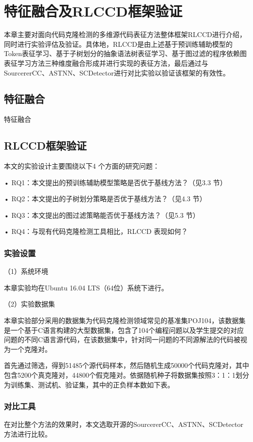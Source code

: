\chapter{特征融合及RLCCD框架验证}
本章主要对面向代码克隆检测的多维源代码表征方法整体框架RLCCD进行介绍，同时进行实验评估及验证。具体地，RLCCD是由上述基于预训练辅助模型的Token表征学习、基于子树划分的抽象语法树表征学习、基于图过滤的程序依赖图表征学习方法三种维度融合形成并进行实现的表征方法，最后通过与SourcererCC、ASTNN、SCDetector进行对比实验以验证该框架的有效性。
\section{特征融合}
特征融合
\section{RLCCD框架验证}
本文的实验设计主要围绕以下4 个方面的研究问题：

• RQ1：本文提出的预训练辅助模型策略是否优于基线方法？（见3.3 节）

• RQ2：本文提出的子树划分策略是否优于基线方法？（见4.3 节）

• RQ3：本文提出的图过滤策略能否优于基线方法？（见5.3 节）

• RQ4：与现有代码克隆检测工具相比，RLCCD 表现如何？

\subsection{实验设置}
（1）系统环境

本章实验均在Ubuntu 16.04 LTS（64位）系统下进行。


（2）实验数据集

本章实验部分采用的数据集为代码克隆检测领域常见的基准集POJ104，该数据集是一个基于C语言构建的大型数据集，包含了104个编程问题以及学生提交的对应问题的不同C语言源代码，在该数据集中，针对同一问题的不同源解法的代码被视为一个克隆对。

首先通过筛选，得到51485个源代码样本，然后随机生成50000个代码克隆对，其中包含5200个真克隆对，44800个假克隆对。依据随机种子将数据集按照3：1：1划分为训练集、测试机、验证集，其中的正负样本数如下表。


\subsection{对比工具}
在对比整个方法的效果时，本文选取开源的SourcererCC、ASTNN、SCDetector方法进行比较。

